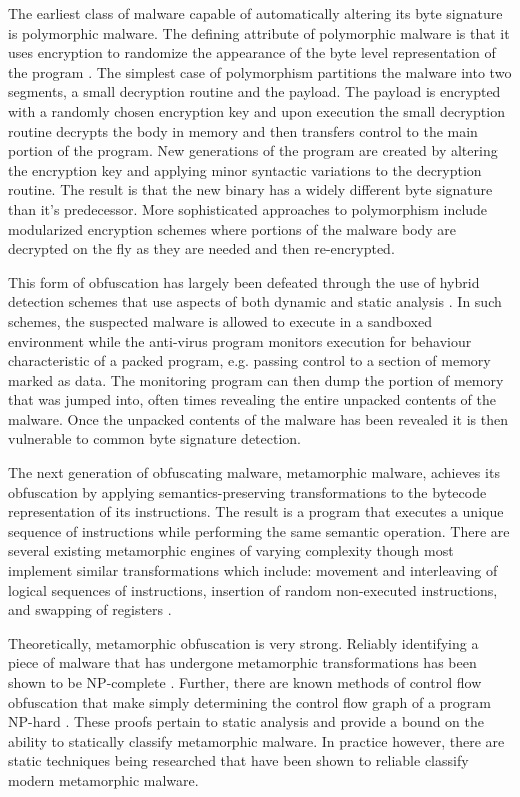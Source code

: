     The earliest class of malware capable of automatically altering its byte
    signature is polymorphic malware. The defining attribute of polymorphic
    malware is that it uses encryption to randomize the appearance of the byte
    level representation of the program \cite{simile}. The simplest case of
    polymorphism partitions the malware into two segments, a small decryption
    routine and the payload. The payload is encrypted with a randomly chosen
    encryption key and upon execution the small decryption routine decrypts the
    body in memory and then transfers control to the main portion of the
    program. New generations of the program are created by altering the
    encryption key and applying minor syntactic variations to the decryption
    routine. The result is that the new binary has a widely different byte
    signature than it's predecessor. More sophisticated approaches to
    polymorphism include modularized encryption schemes where portions of the
    malware body are decrypted on the fly as they are needed and then
    re-encrypted.

    This form of obfuscation has largely been defeated through the use of hybrid
    detection schemes that use aspects of both dynamic and static analysis
    \cite{polyunpack,omniunpack,renovo}. In such schemes, the suspected malware
    is allowed to execute in a sandboxed environment while the anti-virus
    program monitors execution for behaviour characteristic of a packed program,
    e.g. passing control to a section of memory marked as data. The monitoring
    program can then dump the portion of memory that was jumped into, often
    times revealing the entire unpacked contents of the malware. Once the
    unpacked contents of the malware has been revealed it is then vulnerable to
    common byte signature
    detection.

    The next generation of obfuscating malware, metamorphic malware, achieves
    its obfuscation by applying semantics-preserving transformations to the
    bytecode representation of its instructions. The result is a program that
    executes a unique sequence of instructions while performing the same
    semantic operation. There are several existing metamorphic engines of
    varying complexity though most implement similar transformations which
    include: movement and interleaving of logical sequences of instructions,
    insertion of random non-executed instructions, and swapping of registers
    \cite{simile}. 

    Theoretically, metamorphic obfuscation is very strong. Reliably identifying
    a piece of malware that has undergone metamorphic transformations has been
    shown to be NP-complete \cite{npcomplete}. Further, there are known methods
    of control flow obfuscation that make simply determining the control flow
    graph of a program NP-hard \cite{controlflow}. These proofs pertain to
    static analysis and provide a bound on the ability to statically classify
    metamorphic malware. In practice however, there are static techniques being
    researched that have been shown to reliable classify modern metamorphic
    malware.

